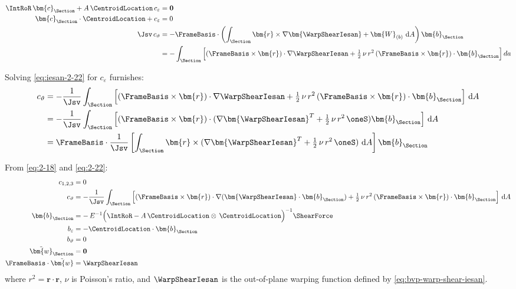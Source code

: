 \begin{equation}
\begin{aligned}
\IntRoR\,\bm{c}_{\Section} + A\,\CentroidLocation\,c_{\varepsilon}&= \mathbf{0} \\
\bm{c}_{\Section}\cdot \CentroidLocation + c_{\varepsilon}& = 0 \\
\Jsv \,c_{\vartheta}&= -\FrameBasis\cdot\left(\int_{\Section} \bm{r}\times \nabla \bm{\WarpShearIesan}
+ \bm{W}_{(b)} \mathrm{~d}A \right)\bm{b}_{\Section} \\
&= -\int_{\Section} \Big[(\FrameBasis\times \bm{r})\cdot \nabla \WarpShearIesan
+ \tfrac{1}{2}\,\nu\, r^2\,(\FrameBasis\times \bm{r})\cdot \bm{b}_{\Section}\Big]\, da \\
\end{aligned} \\
\label{eq:iesan-2-22}
\end{equation}

Solving \eqref{eq:iesan-2-22} for \(c_{\varepsilon}\) furnishes:
\[
\begin{aligned}
c_{\vartheta}
&=- \frac{1}{\Jsv}\int_{\Section} \Big[(\FrameBasis\times \bm{r})\cdot \nabla \WarpShearIesan
+ \tfrac{1}{2}\,\nu\, r^2 \,(\FrameBasis\times \bm{r})\cdot \bm{b}_{\Section}\Big]\mathrm{~d}A \\
 &=- \frac{1}{\Jsv}\int_{\Section} \Big[(\FrameBasis\times \bm{r})\cdot (\nabla \bm{\WarpShearIesan}^T
+ \tfrac{1}{2}\,\nu\, r^2 \,\oneS) \bm{b}_{\Section}\Big]\mathrm{~d}A \\
 &= \FrameBasis\cdot\frac{1}{\Jsv}\left[\int_{\Section} \bm{r}\times (\nabla \bm{\WarpShearIesan}^T
+ \tfrac{1}{2}\,\nu\, r^2 \,\oneS)\mathrm{~d}A \right] \bm{b}_{\Section} \\
\end{aligned}
\]


From \eqref{eq:2-18} and \eqref{eq:2-22}:
\begin{equation*}
    \begin{aligned}
        c_{1,2,3} &= 0\\
        c_{\vartheta} &=- \frac{1}{\Jsv}\int_{\Section} \Big[(\FrameBasis\times \bm{r})\cdot \nabla (\bm{\WarpShearIesan}\cdot\bm{b}_{\Section})
+ \tfrac{1}{2}\,\nu\, r^2 \,(\FrameBasis\times \bm{r})\cdot \bm{b}_{\Section}\Big]\mathrm{~d}A \\
\bm{b}_{\Section} &= -\,E^{-1}\Big(\IntRoR - A\,\CentroidLocation\otimes\,\CentroidLocation\Big)^{-1}\ShearForce \\
 b_\varepsilon &=-\CentroidLocation\cdot\bm{b}_{\Section} \\
b_\vartheta &=0 \\
    \tilde{\bm{w}}_{\Section}&= \mathbf{0} \\
    \FrameBasis\cdot\tilde{\bm{w}} &= \WarpShearIesan \\
    \end{aligned}
\end{equation*}
where $r^2 = \bm{r} \cdot \bm{r}$, $\nu$ is Poisson's ratio, and $\WarpShearIesan$ is the out-of-plane warping function defined by \eqref{eq:bvp-warp-shear-iesan}.


